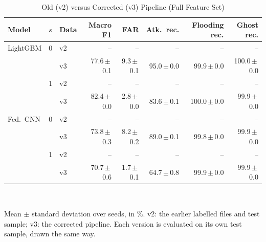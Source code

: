 \begin{table}[t]
\centering
\scriptsize
\caption{Old (v2) versus Corrected (v3) Pipeline (Full Feature Set)}
\label{tab:v2v3}
\setlength{\tabcolsep}{3pt}
\begin{tabular}{lllrrrrr}
\toprule
Model & $s$ & Data & Macro F1 & FAR & Atk.\ rec. & Flooding rec. & Ghost rec. \\
\midrule
LightGBM & 0 & v2 & -- & -- & -- & -- & -- \\
 &  & v3 & 77.6{\,}$\pm${\,}0.1 & 9.3{\,}$\pm${\,}0.1 & 95.0{\,}$\pm${\,}0.0 & 99.9{\,}$\pm${\,}0.0 & 100.0{\,}$\pm${\,}0.0 \\
 & 1 & v2 & -- & -- & -- & -- & -- \\
 &  & v3 & 82.4{\,}$\pm${\,}0.0 & 2.8{\,}$\pm${\,}0.0 & 83.6{\,}$\pm${\,}0.1 & 100.0{\,}$\pm${\,}0.0 & 99.9{\,}$\pm${\,}0.0 \\
\midrule
Fed.\ CNN & 0 & v2 & -- & -- & -- & -- & -- \\
 &  & v3 & 73.8{\,}$\pm${\,}0.3 & 8.2{\,}$\pm${\,}0.2 & 89.0{\,}$\pm${\,}0.1 & 99.8{\,}$\pm${\,}0.0 & 99.9{\,}$\pm${\,}0.0 \\
 & 1 & v2 & -- & -- & -- & -- & -- \\
 &  & v3 & 70.7{\,}$\pm${\,}0.6 & 1.7{\,}$\pm${\,}0.1 & 64.7{\,}$\pm${\,}0.8 & 99.9{\,}$\pm${\,}0.0 & 99.9{\,}$\pm${\,}0.0 \\
\bottomrule
\end{tabular}
\\[2pt]
\parbox{\linewidth}{\scriptsize Mean $\pm$ standard deviation over seeds, in \%. v2: the earlier labelled files and test sample; v3: the corrected pipeline. Each version is evaluated on its own test sample, drawn the same way.}
\end{table}
